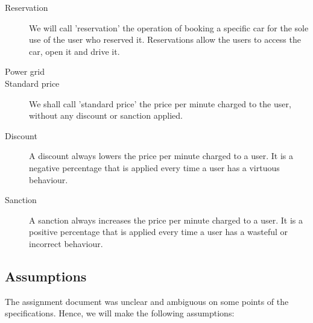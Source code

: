 \documentclass{article}
\begin{document}
\begin{description}
				
				\item[Reservation] We will call 'reservation' the operation of booking a specific car for the sole use of the user who reserved it. Reservations allow the users to access the car, open it and drive it. 
				
				\item[Power grid] %
				
				\item[Standard price] We shall call 'standard price' the price per minute charged to the user, without any discount or sanction applied. 
				
				\item[Discount] A discount always lowers the price per minute charged to a user. It is a negative percentage that is applied every time a user has a virtuous behaviour. 
				\item[Sanction] A sanction always increases the price per minute charged to a user. It is a positive percentage that is applied every time a user has a wasteful or incorrect behaviour. 
				
			\end{description}

		\subsection{Assumptions}
			The assignment document was unclear and ambiguous on some points of the specifications. Hence, we will make the following assumptions:
			
\end{document}
